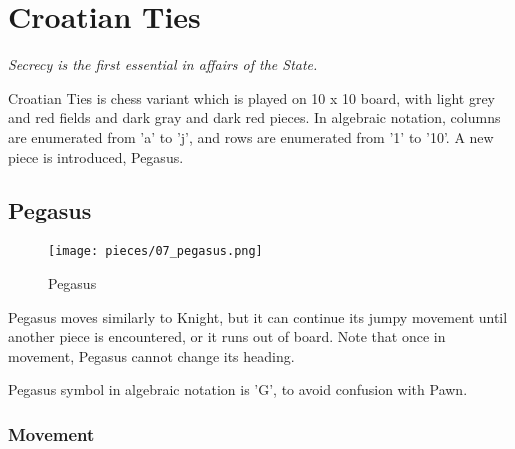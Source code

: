 

\chapter*{Croatian Ties}

\begin{flushright}
\parbox{0.7\textwidth}{
\emph{Secrecy is the first essential in affairs of the State. \\
 } }
\end{flushright}

\noindent
Croatian Ties is chess variant which is played on 10 x 10 board,
with light grey and red fields and dark gray and dark red pieces.
In algebraic notation, columns are enumerated from 'a' to 'j',
and rows are enumerated from '1' to '10'. A new piece is
introduced, Pegasus.

\clearpage %

\section*{Pegasus}

\noindent
\begin{wrapfigure}[9]{l}{0.4\textwidth}
\centering
\texttt{[image: pieces/07\_pegasus.png]}
\caption{Pegasus}
\label{fig:07_pegasus}
\end{wrapfigure}
Pegasus moves similarly to Knight, but it can continue its jumpy movement
until another piece is encountered, or it runs out of board. Note that once
in movement, Pegasus cannot change its heading.

Pegasus symbol in algebraic notation is 'G', to avoid confusion with Pawn.

\vspace{2.0\baselineskip}
\subsection*{Movement}

